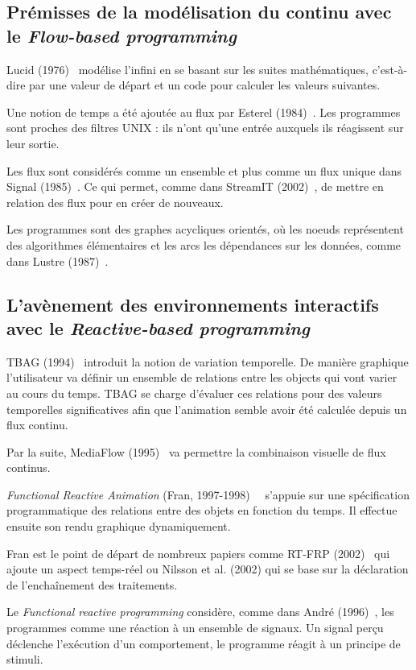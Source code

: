 \documentclass{llncs}
\newcommand{\FB}{\emph{Flow-based programming} }
\newcommand{\RP}{\emph{Reactive-based programming} }
\newcommand{\FRP}{\emph{Functional reactive programming} }
\begin{document}
\subsection{Prémisses de la modélisation du continu avec le \FB}
Lucid (1976)~\cite{AshcroftW76} modélise l'infini en se basant sur les suites mathématiques,
c'est-à-dire par une valeur de départ et un code pour calculer les valeurs suivantes.

Une notion de temps a été ajoutée au flux par Esterel (1984)~\cite{Berry84}.
Les programmes sont proches des filtres UNIX : ils n'ont qu'une entrée auxquels
ils réagissent sur leur sortie.

Les flux sont considérés comme un ensemble et plus comme un flux unique dans Signal (1985)~\cite{Benveniste85}.
Ce qui permet, comme dans StreamIT (2002)~\cite{Thies02}, de mettre en relation des flux
pour en créer de nouveaux.

Les programmes sont des graphes acycliques orientés, où les noeuds représentent des
algorithmes élémentaires et les arcs les dépendances sur les données, comme dans
Lustre (1987)~\cite{Caspi87}.

\subsection{L'avènement des environnements interactifs avec le \RP}
TBAG (1994)~\cite{Elliott94} introduit la notion de variation temporelle.
De manière graphique l'utilisateur va définir un ensemble de relations
entre les objects qui vont varier au cours du temps.
TBAG se charge d'évaluer ces relations pour des valeurs temporelles
significatives afin que l'animation semble avoir été calculée depuis
un flux continu.

Par la suite, MediaFlow (1995)~\cite{Elliott95} va permettre la combinaison visuelle
de flux continus.

\emph{Functional Reactive Animation} (Fran, 1997-1998)~\cite{Elliott97}~\cite{Elliott98}
s'appuie sur une spécification programmatique des relations entre des objets
en fonction du temps.
Il effectue ensuite son rendu graphique dynamiquement.

Fran est le point de départ de nombreux papiers comme RT-FRP (2002)~\cite{Wan02}
qui ajoute un aspect temps-réel ou Nilsson et al. (2002)\cite{Nilsson2002a} qui se base
sur la déclaration de l'enchaînement des traitements.

Le \FRP considère, comme dans André (1996)~\cite{Andre96}, les programmes comme
une réaction à un ensemble de signaux. Un signal perçu déclenche l'exécution
d'un comportement, le programme réagit à un principe de stimuli.
\end{document}
